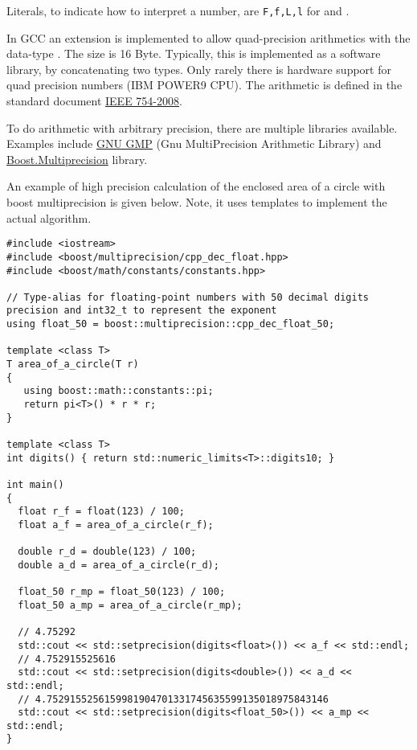 Literals, to indicate how to interpret a number, are \texttt{F,f,L,l} for  and .

\begin{rem}
  In GCC an extension is implemented to allow quad-precision arithmetics with the data-type . The size is 16 Byte. Typically, this is implemented as a software library, \eg by concatenating two  types. Only rarely there is hardware support for quad precision
  numbers (\eg IBM POWER9 CPU). The arithmetic is defined in the standard document \href{https://doi.org/10.1109%2FIEEESTD.2008.4610935}{IEEE 754-2008}.
\end{rem}

\begin{rem}
  To do arithmetic with arbitrary precision, there are multiple libraries available. Examples include \href{https://gmplib.org/}{GNU GMP} (Gnu MultiPrecision Arithmetic Library) and \href{https://www.boost.org/doc/libs/1_71_0/libs/multiprecision/doc/html/index.html}{Boost.Multiprecision} library.

  An example of high precision calculation of the enclosed area of a circle with boost multiprecision is given below. Note, it uses templates to implement the actual algorithm.
\end{rem}
\begin{verbatim}
#include <iostream>
#include <boost/multiprecision/cpp_dec_float.hpp>
#include <boost/math/constants/constants.hpp>

// Type-alias for floating-point numbers with 50 decimal digits precision and int32_t to represent the exponent
using float_50 = boost::multiprecision::cpp_dec_float_50;

template <class T>
T area_of_a_circle(T r)
{
   using boost::math::constants::pi;
   return pi<T>() * r * r;
}

template <class T>
int digits() { return std::numeric_limits<T>::digits10; }

int main()
{
  float r_f = float(123) / 100;
  float a_f = area_of_a_circle(r_f);

  double r_d = double(123) / 100;
  double a_d = area_of_a_circle(r_d);

  float_50 r_mp = float_50(123) / 100;
  float_50 a_mp = area_of_a_circle(r_mp);

  // 4.75292
  std::cout << std::setprecision(digits<float>()) << a_f << std::endl;
  // 4.752915525616
  std::cout << std::setprecision(digits<double>()) << a_d << std::endl;
  // 4.7529155256159981904701331745635599135018975843146
  std::cout << std::setprecision(digits<float_50>()) << a_mp << std::endl;
}
\end{verbatim}


